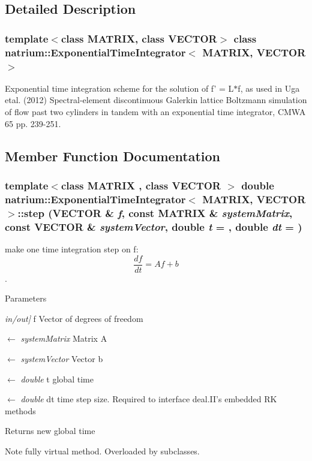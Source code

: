 \subsection{Detailed Description}
\subsubsection*{template$<$class MATRIX, class VECTOR$>$ class natrium::ExponentialTimeIntegrator$<$ MATRIX, VECTOR $>$}

Exponential time integration scheme for the solution of f' = L$\ast$f, as used in Uga etal. (2012) Spectral-\/element discontinuous Galerkin lattice Boltzmann simulation of flow past two cylinders in tandem with an exponential time integrator, CMWA 65 pp. 239-\/251. 

\subsection{Member Function Documentation}
\hypertarget{classnatrium_1_1ExponentialTimeIntegrator_ae0a9cff9bdafab123016db72d1439ef8}{
\subsubsection[{step}]{\setlength{\rightskip}{0pt plus 5cm}template$<$class MATRIX , class VECTOR $>$ double {\bf natrium::ExponentialTimeIntegrator}$<$ MATRIX, VECTOR $>$::step (VECTOR \& {\em f}, \/  const MATRIX \& {\em systemMatrix}, \/  const VECTOR \& {\em systemVector}, \/  double {\em t} = {}, \/  double {\em dt} = {})}}
\label{classnatrium_1_1ExponentialTimeIntegrator_ae0a9cff9bdafab123016db72d1439ef8}


make one time integration step on f: \[ \frac{df}{dt} = Af+b \]. 
\begin{DoxyParams}{Parameters}
\item[{\em in/out\mbox{]}}]f Vector of degrees of freedom \item[\mbox{$\leftarrow$} {\em systemMatrix}]Matrix A \item[\mbox{$\leftarrow$} {\em systemVector}]Vector b \item[\mbox{$\leftarrow$} {\em double}]t global time \item[\mbox{$\leftarrow$} {\em double}]dt time step size. Required to interface deal.II's embedded RK methods \end{DoxyParams}
\begin{DoxyReturn}{Returns}
new global time 
\end{DoxyReturn}
\begin{DoxyNote}{Note}
fully virtual method. Overloaded by subclasses. 
\end{DoxyNote}


